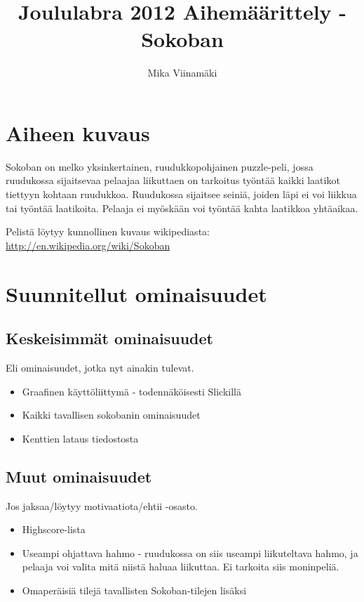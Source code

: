 \documentclass{article}
\begin{document}
\title{Joululabra 2012 Aihemäärittely - Sokoban}
\author{Mika Viinamäki}
\maketitle

\section{Aiheen kuvaus}
Sokoban on melko yksinkertainen, ruudukkopohjainen puzzle-peli, jossa ruudukossa sijaitsevaa pelaajaa liikuttaen on tarkoitus työntää kaikki laatikot tiettyyn kohtaan ruudukkoa. Ruudukossa sijaitsee seiniä, joiden läpi ei voi liikkua tai työntää laatikoita. Pelaaja ei myöskään voi työntää kahta laatikkoa yhtäaikaa.
    
Pelistä löytyy kunnollinen kuvaus wikipediasta: \url{http://en.wikipedia.org/wiki/Sokoban}
    
\section{Suunnitellut ominaisuudet}

\subsection{Keskeisimmät ominaisuudet}

Eli ominaisuudet, jotka nyt ainakin tulevat.

\begin{itemize}
    \item Graafinen käyttöliittymä - todennäköisesti Slickillä
    \item Kaikki tavallisen sokobanin ominaisuudet
    \item Kenttien lataus tiedostosta
\end{itemize}

\subsection{Muut ominaisuudet}

Jos jaksaa/löytyy motivaatiota/ehtii -osasto.

\begin{itemize}
    \item Highscore-lista
    \item Useampi ohjattava hahmo - ruudukossa on siis useampi liikuteltava hahmo, ja pelaaja voi valita mitä niistä haluaa liikuttaa. Ei tarkoita siis moninpeliä. 
    \item Omaperäisiä tilejä tavallisten Sokoban-tilejen lisäksi
\end{itemize}
\end{document}
